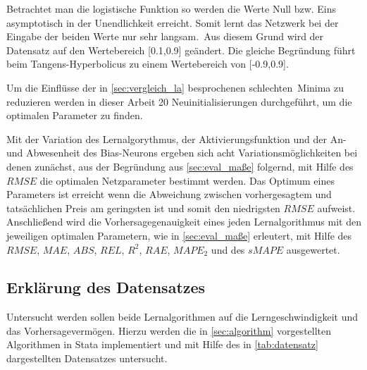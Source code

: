 Betrachtet man die logistische Funktion so werden die Werte Null bzw. Eins asymptotisch in der Unendlichkeit erreicht. Somit lernt das Netzwerk bei der Eingabe der beiden Werte nur sehr langsam.\, Aus diesem Grund wird der Datensatz auf den Wertebereich [0.1,0.9] geändert. Die gleiche Begründung führt beim Tangens-Hyperbolicus zu einem Wertebereich von [-0.9,0.9].

Um die Einflüsse der in \autoref{sec:vergleich_la} besprochenen \glqq schlechten\grqq~Minima zu reduzieren werden in dieser Arbeit 20 Neuinitialisierungen durchgeführt, um die optimalen Parameter zu finden.

Mit der Variation des Lernalgorythmus, der Aktivierungsfunktion und der An- und Abwesenheit des Bias-Neurons ergeben sich acht Variationsmöglichkeiten bei denen zunächst, aus der Begründung aus \autoref{sec:eval_maße} folgernd, mit Hilfe des $RMSE$ die optimalen Netzparameter bestimmt werden. Das Optimum eines Parameters ist erreicht wenn die Abweichung zwischen vorhergesagtem und tatsächlichen Preis am geringsten ist und somit den niedrigsten $RMSE$ aufweist. Anschließend wird die Vorhersagegenauigkeit eines jeden Lernalgorithmus mit den jeweiligen optimalen Parametern, wie in \autoref{sec:eval_maße} erleutert, mit Hilfe des $RMSE$, $MAE$, $ABS$, $REL$, $R^2$, $RAE$, $MAPE_2$ und des $sMAPE$ ausgewertet.

\subsection{Erklärung des Datensatzes}\label{sec:datensatz}

Untersucht werden sollen beide Lernalgorithmen auf die Lerngeschwindigkeit und das Vorhersagevermögen. Hierzu werden die in \autoref{sec:algorithm} vorgestellten Algorithmen in Stata implementiert und mit Hilfe des in \autoref{tab:datensatz} dargestellten Datensatzes untersucht.

